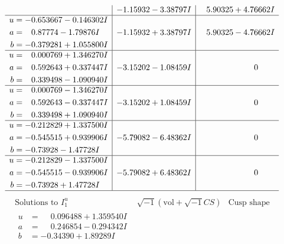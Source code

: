 \documentclass[1p]{elsarticle_modified}
\theoremstyle{definition}
\newcommand{\I}{\sqrt{-1}}
\begin{document}
$$\begin{array}{c|c|c}
 & -1.15932 - 3.38797 I & \phantom{-}5.90325 + 4.76662 I \\ \hline\begin{aligned}
u &= -0.653667 - 0.146302 I \\
a &= \phantom{-}0.87774 - 1.79876 I \\
b &= -0.379281 + 1.055800 I\end{aligned}
 & -1.15932 + 3.38797 I & \phantom{-}5.90325 - 4.76662 I \\ \hline\begin{aligned}
u &= \phantom{-}0.000769 + 1.346270 I \\
a &= \phantom{-}0.592643 + 0.337447 I \\
b &= \phantom{-}0.339498 - 1.090940 I\end{aligned}
 & -3.15202 - 1.08459 I & \phantom{-0.000000 } 0 \\ \hline\begin{aligned}
u &= \phantom{-}0.000769 - 1.346270 I \\
a &= \phantom{-}0.592643 - 0.337447 I \\
b &= \phantom{-}0.339498 + 1.090940 I\end{aligned}
 & -3.15202 + 1.08459 I & \phantom{-0.000000 } 0 \\ \hline\begin{aligned}
u &= -0.212829 + 1.337500 I \\
a &= -0.545515 + 0.939906 I \\
b &= -0.73928 - 1.47728 I\end{aligned}
 & -5.79082 - 6.48362 I & \phantom{-0.000000 } 0 \\ \hline\begin{aligned}
u &= -0.212829 - 1.337500 I \\
a &= -0.545515 - 0.939906 I \\
b &= -0.73928 + 1.47728 I\end{aligned}
 & -5.79082 + 6.48362 I & \phantom{-0.000000 } 0\\
 \hline 
 \end{array}$$\newpage$$\begin{array}{c|c|c}  
\text{Solutions to }I^u_{1}& \I (\text{vol} + \sqrt{-1}CS) & \text{Cusp shape}\\
 \hline 
\begin{aligned}
u &= \phantom{-}0.096488 + 1.359540 I \\
a &= \phantom{-}0.246854 - 0.294342 I \\
b &= -0.34390 + 1.89289 I\end{aligned}

\end{array}$$
\end{document}
